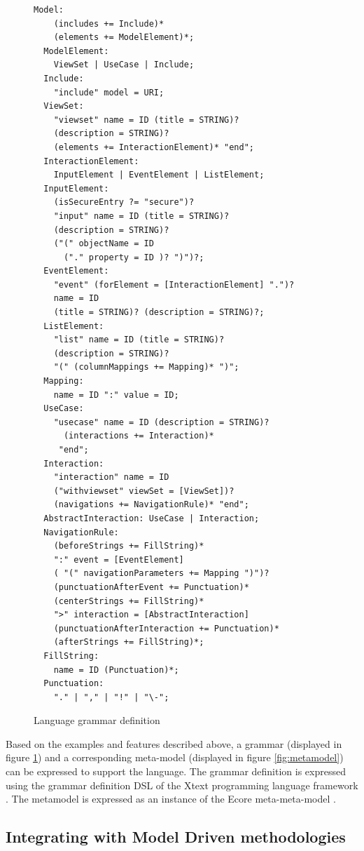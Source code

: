 \documentclass[conference]{IEEEtran}
\begin{document}
\begin{figure}
  \begin{lstlisting}[language=ViewsetDSLMeta]
  Model:
    (includes += Include)*
    (elements += ModelElement)*;
  ModelElement:
    ViewSet | UseCase | Include;
  Include:
    "include" model = URI;
  ViewSet:
    "viewset" name = ID (title = STRING)?
    (description = STRING)?
    (elements += InteractionElement)* "end";
  InteractionElement:
    InputElement | EventElement | ListElement;
  InputElement:
    (isSecureEntry ?= "secure")?
    "input" name = ID (title = STRING)?
    (description = STRING)?
    ("(" objectName = ID
      ("." property = ID )? ")")?;
  EventElement:
    "event" (forElement = [InteractionElement] ".")?
    name = ID
    (title = STRING)? (description = STRING)?;
  ListElement:
    "list" name = ID (title = STRING)?
    (description = STRING)?
    "(" (columnMappings += Mapping)* ")";
  Mapping:
    name = ID ":" value = ID;
  UseCase:
    "usecase" name = ID (description = STRING)?
      (interactions += Interaction)*
     "end";
  Interaction:
    "interaction" name = ID 
    ("withviewset" viewSet = [ViewSet])?
    (navigations += NavigationRule)* "end";
  AbstractInteraction: UseCase | Interaction;
  NavigationRule:
    (beforeStrings += FillString)*
    ":" event = [EventElement]
    ( "(" navigationParameters += Mapping ")")?
    (punctuationAfterEvent += Punctuation)*
    (centerStrings += FillString)*
    ">" interaction = [AbstractInteraction]
    (punctuationAfterInteraction += Punctuation)*
    (afterStrings += FillString)*;
  FillString:
    name = ID (Punctuation)*;
  Punctuation:
    "." | "," | "!" | "\-";
  \end{lstlisting}
  \caption{Language grammar definition}
  \label{fig:grammar}
\end{figure}


Based on the examples and features described above, a grammar (displayed in
figure \ref{fig:grammar}) and a corresponding meta-model (displayed in figure
\ref{fig:metamodel}) can be expressed to support the language. The grammar
definition is expressed using the grammar definition DSL of the Xtext
programming language framework \cite{EfftingeVolter06}.  The metamodel is
expressed as an instance of the Ecore meta-meta-model \cite{EclipseModeling10}.

\subsection{Integrating with Model Driven methodologies}
\end{document}
